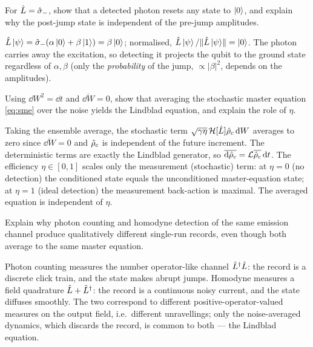 \begin{exercise}
For $\hat{L}=\hat\sigma_-$, show that a detected photon resets any
state to $\ket0$, and explain why the post-jump state is
independent of the pre-jump amplitudes.
\begin{solution}
$\hat{L}\ket\psi=\hat\sigma_-(\alpha\ket0+\beta\ket1)=\beta\ket0$;
normalised, $\hat{L}\ket\psi/\lVert\hat{L}\ket\psi\rVert=\ket0$. The
photon carries away the excitation, so detecting it projects the
qubit to the ground state regardless of $\alpha,\beta$ (only the
\emph{probability} of the jump, $\propto|\beta|^2$, depends on the
amplitudes).
\end{solution}
\end{exercise}

\begin{exercise}
Using $\dd W^2=\dd t$ and $\overline{\dd W}=0$, show that averaging
the stochastic master equation \cref{eq:sme} over the noise yields
the Lindblad equation, and explain the role of $\eta$.
\begin{solution}
Taking the ensemble average, the stochastic term
$\sqrt{\gamma\eta}\,\mathcal H[\hat{L}]\hat{\rho}_c\,\dd W$ averages to
zero since $\overline{\dd W}=0$ and $\hat{\rho}_c$ is independent of
the future increment. The deterministic terms are exactly the
Lindblad generator, so $\overline{\dd\hat{\rho}_c}=\mathcal L\overline{\hat{\rho}_c}\,\dd t$.
The efficiency $\eta\in[0,1]$ scales only the measurement
(stochastic) term: at $\eta=0$ (no detection) the conditioned state
equals the unconditioned master-equation state; at $\eta=1$ (ideal
detection) the measurement back-action is maximal. The averaged
equation is independent of $\eta$.
\end{solution}
\end{exercise}

\begin{exercise}
Explain why photon counting and homodyne detection of the same
emission channel produce qualitatively different single-run records,
even though both average to the same master equation.
\begin{solution}
Photon counting measures the number operator-like channel
$\hat{L}^\dagger\hat{L}$: the record is a discrete click train, and the
state makes abrupt jumps. Homodyne measures a field quadrature
$\hat{L}+\hat{L}^\dagger$: the record is a continuous noisy current, and
the state diffuses smoothly. The two correspond to different
positive-operator-valued measures on the output field, i.e.\
different unravellings; only the noise-averaged dynamics, which
discards the record, is common to both --- the Lindblad equation.
\end{solution}
\end{exercise}

